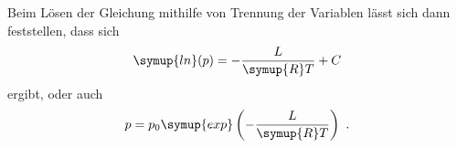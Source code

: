 \noindent Beim Lösen der Gleichung mithilfe von Trennung der Variablen lässt sich dann feststellen, dass sich
\begin{equation*}
    \symup{ln}(p)=-\frac{L}{\symup{R}T}+C
\end{equation*}
ergibt, oder auch
\begin{equation}
    p=p_0 \symup{exp} \left(-\frac{L}{\symup{R}T}\right) \text{ .}
    \label{eqn:druck}
\end{equation}




